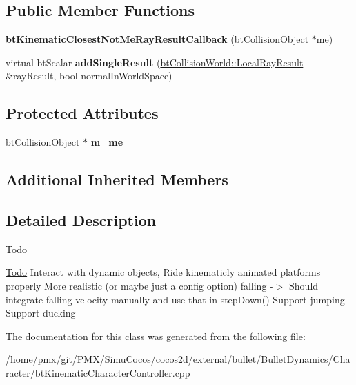 \subsection*{Public Member Functions}
\begin{DoxyCompactItemize}
\item 
\mbox{\label{classbtKinematicClosestNotMeRayResultCallback_aa539e37d46a890bc029b6ce7e7e00498}} 
{\bfseries bt\+Kinematic\+Closest\+Not\+Me\+Ray\+Result\+Callback} (bt\+Collision\+Object $\ast$me)
\item 
\mbox{\label{classbtKinematicClosestNotMeRayResultCallback_a8cf27c3c05134a19031519f908d4b73c}} 
virtual bt\+Scalar {\bfseries add\+Single\+Result} (\hyperlink{structbtCollisionWorld_1_1LocalRayResult}{bt\+Collision\+World\+::\+Local\+Ray\+Result} \&ray\+Result, bool normal\+In\+World\+Space)
\end{DoxyCompactItemize}
\subsection*{Protected Attributes}
\begin{DoxyCompactItemize}
\item 
\mbox{\label{classbtKinematicClosestNotMeRayResultCallback_a22df57a16186c13bcccd9ff7050cbeb8}} 
bt\+Collision\+Object $\ast$ {\bfseries m\+\_\+me}
\end{DoxyCompactItemize}
\subsection*{Additional Inherited Members}


\subsection{Detailed Description}
\begin{DoxyRefDesc}{Todo}
\item[\hyperlink{todo__todo000027}{Todo}]Interact with dynamic objects, Ride kinematicly animated platforms properly More realistic (or maybe just a config option) falling -\/$>$ Should integrate falling velocity manually and use that in step\+Down() Support jumping Support ducking \end{DoxyRefDesc}


The documentation for this class was generated from the following file\+:\begin{DoxyCompactItemize}
\item 
/home/pmx/git/\+P\+M\+X/\+Simu\+Cocos/cocos2d/external/bullet/\+Bullet\+Dynamics/\+Character/bt\+Kinematic\+Character\+Controller.\+cpp\end{DoxyCompactItemize}
